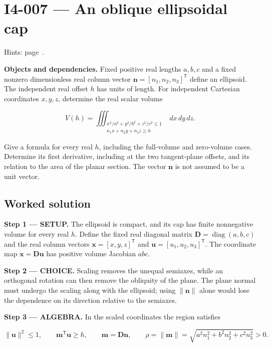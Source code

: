 \documentclass[11pt,oneside,openany]{book}
\begin{document}
\section{I4-007 --- An oblique ellipsoidal cap}
\label{problem:I4-007}
{\small Hints: page~\pageref{hints:I4-007}.}\par\medskip

\textbf{Objects and dependencies.} Fixed positive real lengths \(a,b,c\) and a fixed nonzero dimensionless real column vector \(\mathbf n=[n_1,n_2,n_3]^{\mathsf T}\) define an ellipsoid. The independent real offset \(h\) has units of length. For independent Cartesian coordinates \(x,y,z\), determine the real scalar volume

\[
V(h)=\iiint_{\substack{x^2/a^2+y^2/b^2+z^2/c^2\le1\\n_1x+n_2y+n_3z\ge h}}dx\,dy\,dz.
\]

Give a formula for every real \(h\), including the full-volume and zero-volume cases. Determine its first derivative, including at the two tangent-plane offsets, and its relation to the area of the planar section. The vector \(\mathbf n\) is not assumed to be a unit vector.
\subsection*{Worked solution}

\textbf{Step 1 --- SETUP.} The ellipsoid is compact, and its cap has finite nonnegative volume for every real \(h\). Define the fixed real diagonal matrix \(\mathbf D=\operatorname{diag}(a,b,c)\) and the real column vectors \(\mathbf x=[x,y,z]^{\mathsf T}\) and \(\mathbf u=[u_1,u_2,u_3]^{\mathsf T}\). The coordinate map \(\mathbf x=\mathbf D\mathbf u\) has positive volume Jacobian \(abc\).

\begin{ChoiceStep}
\textbf{Step 2 --- CHOICE.} Scaling removes the unequal semiaxes, while an orthogonal rotation can then remove the obliquity of the plane. The plane normal must undergo the scaling along with the ellipsoid; using \(\|\mathbf n\|\) alone would lose the dependence on its direction relative to the semiaxes.

\end{ChoiceStep}
\begingroup\color{AlgebraBlue}
\textbf{Step 3 --- ALGEBRA.} In the scaled coordinates the region satisfies

\[
\|\mathbf u\|^2\le1,\qquad
\mathbf m^{\mathsf T}\mathbf u\ge h,\qquad
\mathbf m=\mathbf D\mathbf n,
\qquad \rho=\|\mathbf m\|=\sqrt{a^2n_1^2+b^2n_2^2+c^2n_3^2}>0.
\]
\end{document}
